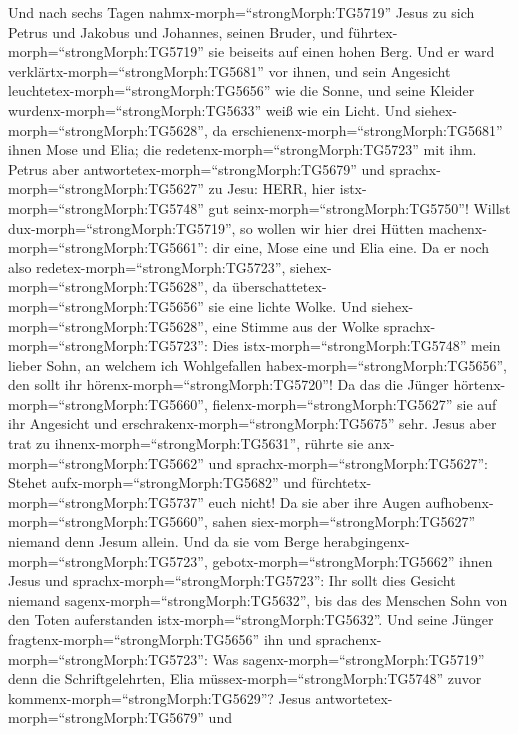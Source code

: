  Und nach sechs Tagen nahmx-morph=``strongMorph:TG5719''
Jesus zu sich Petrus und Jakobus und Johannes, seinen Bruder, und
führtex-morph=``strongMorph:TG5719'' sie beiseits auf einen hohen Berg.
 Und er ward verklärtx-morph=``strongMorph:TG5681'' vor
ihnen, und sein Angesicht leuchtetex-morph=``strongMorph:TG5656'' wie
die Sonne, und seine Kleider wurdenx-morph=``strongMorph:TG5633'' weiß
wie ein Licht.  Und siehex-morph=``strongMorph:TG5628'', da
erschienenx-morph=``strongMorph:TG5681'' ihnen Mose und Elia; die
redetenx-morph=``strongMorph:TG5723'' mit ihm.  Petrus aber
antwortetex-morph=``strongMorph:TG5679'' und
sprachx-morph=``strongMorph:TG5627'' zu Jesu: HERR, hier
istx-morph=``strongMorph:TG5748'' gut
seinx-morph=``strongMorph:TG5750''! Willst
dux-morph=``strongMorph:TG5719'', so wollen wir hier drei Hütten
machenx-morph=``strongMorph:TG5661'': dir eine, Mose eine und Elia eine.
 Da er noch also redetex-morph=``strongMorph:TG5723'',
siehex-morph=``strongMorph:TG5628'', da
überschattetex-morph=``strongMorph:TG5656'' sie eine lichte Wolke. Und
siehex-morph=``strongMorph:TG5628'', eine Stimme aus der Wolke
sprachx-morph=``strongMorph:TG5723'': Dies
istx-morph=``strongMorph:TG5748'' mein lieber Sohn, an welchem ich
Wohlgefallen habex-morph=``strongMorph:TG5656'', den sollt ihr
hörenx-morph=``strongMorph:TG5720''!  Da das die Jünger
hörtenx-morph=``strongMorph:TG5660'',
fielenx-morph=``strongMorph:TG5627'' sie auf ihr Angesicht und
erschrakenx-morph=``strongMorph:TG5675'' sehr.  Jesus aber
trat zu ihnenx-morph=``strongMorph:TG5631'', rührte sie
anx-morph=``strongMorph:TG5662'' und
sprachx-morph=``strongMorph:TG5627'': Stehet
aufx-morph=``strongMorph:TG5682'' und
fürchtetx-morph=``strongMorph:TG5737'' euch nicht!  Da sie
aber ihre Augen aufhobenx-morph=``strongMorph:TG5660'', sahen
siex-morph=``strongMorph:TG5627'' niemand denn Jesum allein.
 Und da sie vom Berge
herabgingenx-morph=``strongMorph:TG5723'',
gebotx-morph=``strongMorph:TG5662'' ihnen Jesus und
sprachx-morph=``strongMorph:TG5723'': Ihr sollt dies Gesicht niemand
sagenx-morph=``strongMorph:TG5632'', bis das des Menschen Sohn von den
Toten auferstanden istx-morph=``strongMorph:TG5632''.  Und
seine Jünger fragtenx-morph=``strongMorph:TG5656'' ihn und
sprachenx-morph=``strongMorph:TG5723'': Was
sagenx-morph=``strongMorph:TG5719'' denn die Schriftgelehrten, Elia
müssex-morph=``strongMorph:TG5748'' zuvor
kommenx-morph=``strongMorph:TG5629''?  Jesus
antwortetex-morph=``strongMorph:TG5679'' und
